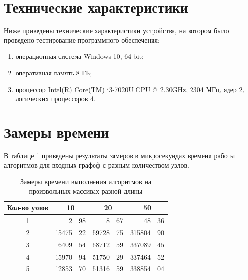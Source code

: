 \documentclass[a4paper,14pt, unknownkeysallowed]{extreport}
\begin{document}
\section{Технические характеристики}
Ниже приведены технические характеристики устройства, на котором было проведено тестирование программного обеспечения:
	
\begin{enumerate}
	\item[1)] операционная система Windows-10, 64-bit;
	\item[2)] оперативная память 8 ГБ;
	\item[3)] процессор	Intel(R) Core(TM) i3-7020U CPU @ 2.30GHz, 2304 МГц, ядер 2, логических процессоров 4.
\end{enumerate}
	
\section{Замеры времени}

В таблице \ref{table:t} приведены результаты замеров в микросекундах времени работы алгоритмов для входных графоф с разным количеством узлов.

\begin{table}[h!]
    \captionsetup{justification=raggedright,singlelinecheck=off}
    \caption{Замеры времени выполнения алгоритмов на произвольных массивах разной длины}
    \label{table:t}
	\begin{center}
        \begin{tabular}{| c | r@{.}l | r@{.}l | r@{.}l |}
        \hline
        Кол-во узлов &
        \multicolumn{2}{c|}{10} & 
        \multicolumn{2}{c|}{20} &
        \multicolumn{2}{c|}{50}\\ \hline
        
        1 & 2&98 & 8&67  & 48&36 \\ \hline 
				
        2 & 15475&22 & 59728&75 & 315804&90 \\ \hline 
		
        3 & 16409&54 & 58712&59 & 337089&45 \\ \hline 
				
        4 & 15970&94 & 51750&29 & 337464&52 \\ \hline 
				
        5 & 12853&70 & 51316&59 & 338854&04 \\ \hline
       
        \end{tabular}
    \end{center}
\end{table}
\end{document}
